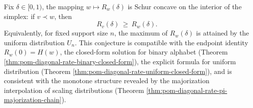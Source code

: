 \begin{conjecture}\label{conj:pom-diagonal-rate-schur-concavity}
Fix \(\delta\in[0,1)\), the mapping \(w\mapsto R_w(\delta)\) is Schur concave on the interior of the simplex: if \(v\prec w\), then
\[
R_v(\delta)\ \ge\ R_w(\delta).
\]
Equivalently, for fixed support size \(n\), the maximum of \(R_w(\delta)\) is attained by the uniform distribution \(U_n\).
This conjecture is compatible with the endpoint identity \(R_w(0)=H(w)\), the closed-form solution for binary alphabet (Theorem \ref{thm:pom-diagonal-rate-binary-closed-form}), the explicit formula for uniform distribution (Theorem \ref{thm:pom-diagonal-rate-uniform-closed-form}), and is consistent with the monotone structure revealed by the majorization interpolation of scaling distributions (Theorem \ref{thm:pom-diagonal-rate-pi-majorization-chain}).
\end{conjecture}



